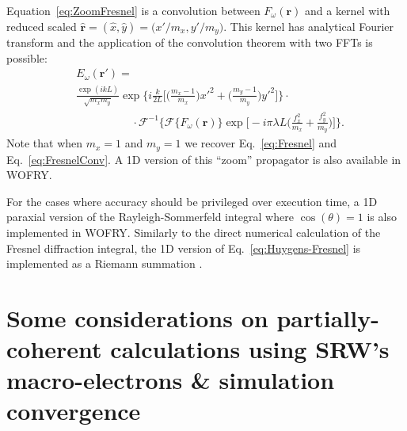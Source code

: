 \documentclass{iucr}              %
\begin{document}
Equation~\ref{eq:ZoomFresnel} is a convolution between $F_\omega(\textbf{r})$ and a kernel with reduced scaled $\hat{\textbf{r}}=(\hat{x},\hat{y})=\big(x'\big/m_x, y'\big/m_y\big)$. This kernel has analytical Fourier transform and the application of the convolution theorem with two FFTs is possible:
\begin{equation}\label{eq:ZoomFresnelConv}
\begin{split}
&E_\omega(\textbf{r}') =\\
&\frac{\exp{(ikL)}}{\sqrt{m_xm_y}}\exp{\bigg\{i\frac{k}{2L}\bigg[\bigg(\frac{m_x-1}{m_x}\bigg)x'^2 +\bigg(\frac{m_y-1}{m_y}\bigg)y'^2\bigg]\bigg\}}\cdot\\
&\qquad\qquad\quad\cdot\mathcal{F}^{-1}\bigg\{\mathcal{F}\{F_\omega(\textbf{r})\}\exp\bigg[-i\pi\lambda L\bigg(\frac{f_x^2}{m_x} +\frac{f_y^2}{m_y}\bigg)\bigg]\bigg\}.
\end{split}
\end{equation}
Note that when $m_x=1$ and $m_y=1$ we recover Eq.~\ref{eq:Fresnel} and Eq.~\ref{eq:FresnelConv}. A 1D version of this ``zoom'' propagator is also available in WOFRY.

For the cases where accuracy should be privileged over execution time, a 1D paraxial version of the Rayleigh-Sommerfeld integral where $\cos(\theta)=1$ is also implemented in WOFRY. Similarly to the direct numerical calculation of the Fresnel diffraction integral, the 1D version of Eq.~\ref{eq:Huygens-Fresnel} is implemented as a Riemann summation \cite{srioLBL}. 










\section{Some considerations on partially-coherent calculations using SRW's macro-electrons \& simulation convergence}
\label{appendix:srw}
\end{document}
